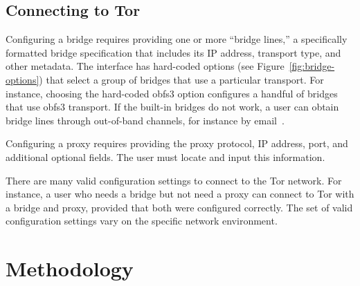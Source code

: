 \documentclass[USenglish,oneside,twocolumn]{article}
\begin{document}
\subsection{Connecting to Tor} 
 

Configuring a bridge requires providing one or more
``bridge lines,'' a specifically formatted bridge specification that
includes its IP address, transport type, and other metadata.
The interface has hard-coded options (see Figure~\ref{fig:bridge-options}) 
that select a group of bridges that use a particular transport.
For instance, choosing the hard-coded obfs3 option
configures a handful of bridges that use obfs3 transport.
If the built-in bridges do not work, a user can obtain bridge lines
through out-of-band channels, for instance by email~\cite{bridgedb}.

Configuring a proxy requires providing the proxy protocol, IP address, port, and additional optional fields. The user must locate and input this information. 

There are many valid configuration settings to connect to the Tor network.
For instance, a user who needs a bridge but not need a proxy can connect to Tor with a bridge and proxy, provided that both were configured correctly. The set of valid configuration settings vary on the specific network environment. 

\section{Methodology} 
\end{document}
